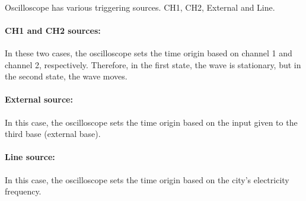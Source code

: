 \documentclass[11pt]{article}
\begin{document}
\begin{question}
{        \paragraph*{} Oscilloscope has various triggering sources. CH1, CH2, External and Line.

        \paragraph*{CH1 and CH2 sources:} In these two cases, the oscilloscope sets the time origin based on channel 1 and channel 2,
        respectively. Therefore, in the first state, the wave is stationary, but in the second state, the wave moves.

        \paragraph*{External source:} In this case, the oscilloscope sets the time origin based on the
        input given to the third base (external base).

        \paragraph*{Line source:} In this case, the oscilloscope sets the time origin based on the city's electricity frequency.
    }

\end{question}

\end{document}
